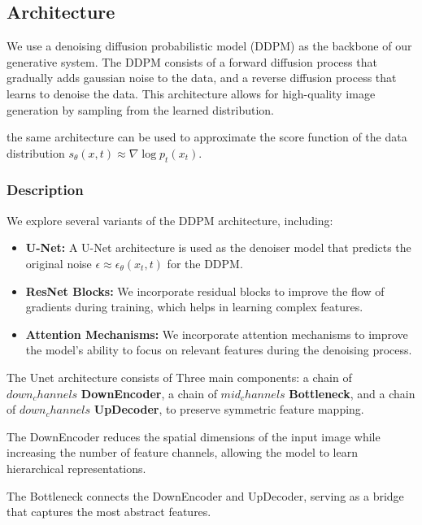 \documentclass[twocolumn,superscriptaddress,aps]{revtex4-1}
\begin{document}
\subsection{Architecture}
We use a denoising diffusion probabilistic model (DDPM) as the backbone of our generative system. The DDPM consists of a forward diffusion process that gradually adds gaussian noise to the data, and a reverse diffusion process that learns to denoise the data. This architecture allows for high-quality image generation by sampling from the learned distribution.

the same architecture can be used to approximate the score function of the data distribution $s_\theta(x , t) \approx \nabla \log p_t(x_t)$.

\subsubsection{Description}

We explore several variants of the DDPM architecture, including:

\begin{itemize}
    \item \textbf{U-Net:} A U-Net architecture is used as the denoiser model that predicts the original noise $\epsilon \approx\epsilon_\theta(x_t, t)$ for the DDPM.
    \item \textbf{ResNet Blocks:} We incorporate residual blocks to improve the flow of gradients during training, which helps in learning complex features.
    \item \textbf{Attention Mechanisms:} We incorporate attention mechanisms to improve the model's ability to focus on relevant features during the denoising process.
\end{itemize}

The Unet architecture consists of Three main components: a chain of $down_channels$ \textbf{DownEncoder}, a chain of $mid_channels$ \textbf{Bottleneck}, and a chain of $down_channels$ \textbf{UpDecoder}, to preserve symmetric feature mapping.

The DownEncoder reduces the spatial dimensions of the input image while increasing the number of feature channels, allowing the model to learn hierarchical representations.

The Bottleneck connects the DownEncoder and UpDecoder, serving as a bridge that captures the most abstract features.
\end{document}
